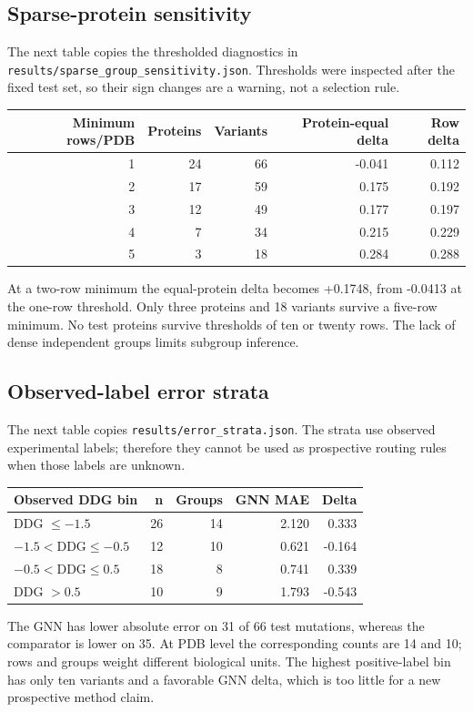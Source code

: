 \subsection{Sparse-protein sensitivity}
The next table copies the thresholded diagnostics in \texttt{results/sparse\_group\_sensitivity.json}. Thresholds were inspected after the fixed test set, so their sign changes are a warning, not a selection rule.
\begin{center}\begin{tabular}{rrrrr}\hline Minimum rows/PDB & Proteins & Variants & Protein-equal delta & Row delta\\\hline
1 & 24 & 66 & -0.041 & 0.112\\
2 & 17 & 59 & 0.175 & 0.192\\
3 & 12 & 49 & 0.177 & 0.197\\
4 & 7 & 34 & 0.215 & 0.229\\
5 & 3 & 18 & 0.284 & 0.288\\
\hline\end{tabular}\end{center}
At a two-row minimum the equal-protein delta becomes +0.1748, from -0.0413 at the one-row threshold. Only three proteins and 18 variants survive a five-row minimum. No test proteins survive thresholds of ten or twenty rows. The lack of dense independent groups limits subgroup inference.
\subsection{Observed-label error strata}
The next table copies \texttt{results/error\_strata.json}. The strata use observed experimental labels; therefore they cannot be used as prospective routing rules when those labels are unknown.
\begin{center}\begin{tabular}{lrrrr}\hline Observed DDG bin & n & Groups & GNN MAE & Delta\\\hline
DDG $\leq -1.5$ & 26 & 14 & 2.120 & 0.333\\
$-1.5 < $DDG$ \leq -0.5$ & 12 & 10 & 0.621 & -0.164\\
$-0.5 < $DDG$ \leq 0.5$ & 18 & 8 & 0.741 & 0.339\\
DDG $>0.5$ & 10 & 9 & 1.793 & -0.543\\
\hline\end{tabular}\end{center}
The GNN has lower absolute error on 31 of 66 test mutations, whereas the comparator is lower on 35. At PDB level the corresponding counts are 14 and 10; rows and groups weight different biological units. The highest positive-label bin has only ten variants and a favorable GNN delta, which is too little for a new prospective method claim.
